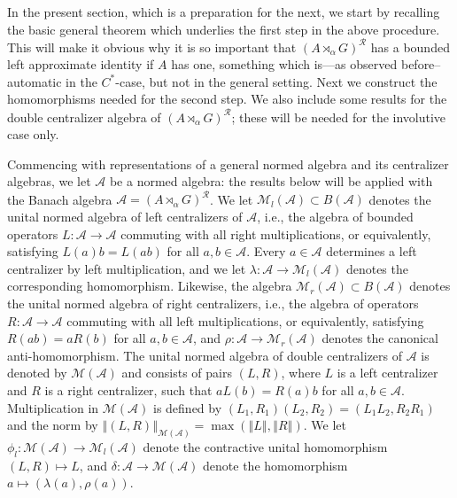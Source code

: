 \documentclass{amsart}
\theoremstyle{plain}
\theoremstyle{definition}
\numberwithin{equation}{section}
\begin{document}
In the present section, which is a preparation for the next, we start by recalling the basic general theorem which underlies the first step in the above procedure. This will make it obvious why it is so important that ${(A {\rtimes}_\alpha G)^\mathcal{R}}$ has a bounded left approximate identity if $A$ has one, something which is---as observed before--automatic in the $C^*$-case, but not in the general setting.  Next  we construct the homomorphisms needed for the second step. We also include some results for the double centralizer algebra of ${(A {\rtimes}_\alpha G)^\mathcal{R}}$; these will be needed for the involutive case only.

Commencing with representations of a general normed algebra and its centralizer algebras, we let ${\mathcal A}$ be a normed algebra: the results below will be applied with the Banach algebra ${\mathcal A} = {(A {\rtimes}_\alpha G)^\mathcal{R}}$. We let ${{\mathcal M}_l(\mathcal A)} \subset B({\mathcal A})$ denotes the unital normed algebra of left centralizers of ${\mathcal A}$, i.e., the algebra of bounded operators $L: {\mathcal A} \to {\mathcal A}$ commuting with all right multiplications, or equivalently, satisfying $L(a)b = L(ab)$ for all $a,b \in {\mathcal A}$. Every $a \in {\mathcal A}$ determines a left centralizer by left multiplication, and we let $\lambda: {\mathcal A} \to {{\mathcal M}_l(\mathcal A)}$ denotes the corresponding homomorphism. Likewise, the algebra ${{\mathcal M}_r(\mathcal A)}\subset B({\mathcal A})$ denotes the unital normed algebra of right centralizers, i.e., the algebra of operators $R: {\mathcal A} \to {\mathcal A}$ commuting with all left multiplications, or equivalently, satisfying $R(ab) = aR(b)$ for all $a, b \in {\mathcal A}$, and $\rho: {\mathcal A} \to {{\mathcal M}_r(\mathcal A)}$ denotes the canonical anti-homomorphism. The unital normed algebra of double centralizers of ${\mathcal A}$ is denoted by ${{\mathcal M}(\mathcal A)}$ and consists of pairs $(L,R)$, where $L$ is a left centralizer and $R$ is a right centralizer, such that $aL(b) = R(a)b$ for all $a,b \in {\mathcal A}$. Multiplication in $\mathcal{M}({\mathcal A})$ is defined by $(L_1, R_1) (L_2, R_2) = (L_1 L_2, R_2 R_1)$ and the norm by ${\left\Vert {(L,R)} \right\Vert}_{\mathcal{M}({\mathcal A})} = \max({\left\Vert {L} \right\Vert}, {\left\Vert {R} \right\Vert})$. We let $\phi_l: {{\mathcal M}(\mathcal A)} \to {{\mathcal M}_l(\mathcal A)}$ denote the contractive unital homomorphism $(L, R) \mapsto L$, and $\delta: \mathcal{A} \to {{\mathcal M}(\mathcal A)}$ denote the homomorphism $a \mapsto (\lambda(a), \rho(a))$.
\end{document}
